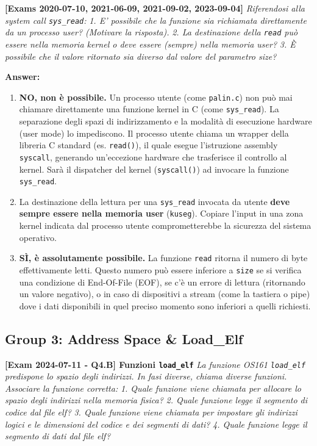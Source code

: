 \vspace{1em}

\textbf{[Exams 2020-07-10, 2021-06-09, 2021-09-02, 2023-09-04]}
\textit{Riferendosi alla system call \texttt{sys\_read}:}
\textit{1. E' possibile che la funzione sia richiamata direttamente da un processo user? (Motivare la risposta).}
\textit{2. La destinazione della \texttt{read} può essere nella memoria kernel o deve essere (sempre) nella memoria user?}
\textit{3. È possibile che il valore ritornato sia diverso dal valore del parametro size?}

\textbf{Answer:}
\begin{enumerate}
    \item \textbf{NO, non è possibile.} Un processo utente (come \texttt{palin.c}) non può mai chiamare direttamente una funzione kernel in C (come \texttt{sys\_read}). La separazione degli spazi di indirizzamento e la modalità di esecuzione hardware (user mode) lo impediscono. Il processo utente chiama un wrapper della libreria C standard (es. \texttt{read()}), il quale esegue l'istruzione assembly \texttt{syscall}, generando un'eccezione hardware che trasferisce il controllo al kernel. Sarà il dispatcher del kernel (\texttt{syscall()}) ad invocare la funzione \texttt{sys\_read}.
    \item La destinazione della lettura per una \texttt{sys\_read} invocata da utente \textbf{deve sempre essere nella memoria user} (\texttt{kuseg}). Copiare l'input in una zona kernel indicata dal processo utente comprometterebbe la sicurezza del sistema operativo.
    \item \textbf{SÌ, è assolutamente possibile.} La funzione \texttt{read} ritorna il numero di byte effettivamente letti. Questo numero può essere inferiore a \texttt{size} se si verifica una condizione di End-Of-File (EOF), se c'è un errore di lettura (ritornando un valore negativo), o in caso di dispositivi a stream (come la tastiera o pipe) dove i dati disponibili in quel preciso momento sono inferiori a quelli richiesti.
\end{enumerate}

\newpage
\subsection*{Group 3: Address Space \& Load\_Elf}

\textbf{[Exam 2024-07-11 - Q4.B] Funzioni \texttt{load\_elf}}
\textit{La funzione OS161 \texttt{load\_elf} predispone lo spazio degli indirizzi. In fasi diverse, chiama diverse funzioni. Associare la funzione corretta:}
\textit{1. Quale funzione viene chiamata per allocare lo spazio degli indirizzi nella memoria fisica?}
\textit{2. Quale funzione legge il segmento di codice dal file elf?}
\textit{3. Quale funzione viene chiamata per impostare gli indirizzi logici e le dimensioni del codice e dei segmenti di dati?}
\textit{4. Quale funzione legge il segmento di dati dal file elf?}


